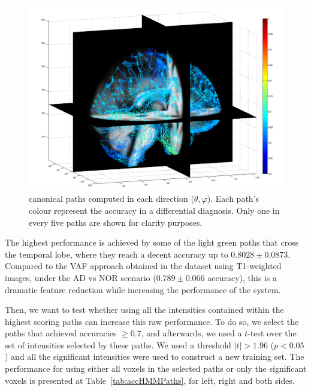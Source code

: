 \begin{figure}
	\begin{center}
		\includegraphics[width=\columnwidth]{Graphics/ch6/accuracyPaths2}
		\caption{canonical paths computed in each direction ($\theta,\varphi$). Each path's colour represent the accuracy in a differential diagnosis. Only one in every five paths are shown for clarity purposes.}
		\label{fig:accuracyMap}
	\end{center}
\end{figure}

The highest performance is achieved by some of the light green paths that cross the temporal lobe, where they reach a decent accuracy up to $0.8028\pm0.0873$. Compared to the \ac{VAF} approach obtained in the \adnimri{} dataset using T1-weighted images, under the AD vs NOR scenario ($0.789 \pm 0.066$ accuracy), this is a dramatic feature reduction while increasing the performance of the system. 

Then, we want to test whether using all the intensities contained within the highest scoring paths can increase this raw performance. To do so, we select the paths that achieved accuracies $\ge0.7$, and afterwards, we used a $t$-test over the set of intensities selected by these paths. We used a threshold $|t|>1.96$ ($p<0.05$) and all the significant intensities were used to construct a new training set. The performance for using either all voxels in the selected paths or only the significant voxels is presented at Table~\ref{tab:accHMMPaths}, for left, right and both sides. 

